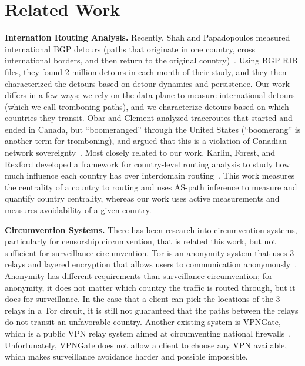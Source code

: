 \section{Related Work}
\label{related}

{\bf Internation Routing Analysis.}  Recently, Shah and Papadopoulos measured international BGP detours (paths that originate in one country, cross international borders, and then return to the original country)~\cite{shah2015characterizing}.  Using BGP RIB files, they found 2 million detours in each month of their study, and they then characterized the detours based on detour dynamics and persistence.  Our work differs in a few ways; we rely on the data-plane to measure international detours (which we call tromboning paths), and we characterize detours based on which countries they transit.  Obar and Clement analyzed traceroutes that started and ended in Canada, but ``boomeranged'' through the United States (``boomerang'' is another term for tromboning), and argued that this is a violation of Canadian network sovereignty~\cite{obar2012internet}.  Most closely related to our work, Karlin, Forest, and Rexford developed a framework for country-level routing analysis to study how much influence each country has over interdomain routing~\cite{karlin2009nation}.  This work measures the centrality of a country to routing and uses AS-path inference to measure and quantify country centrality, whereas our work uses active measurements and measures avoidability of a given country.

{\bf Circumvention Systems.}  There has been research into circumvention systems, particularly for censorship circumvention, that is related this work, but not sufficient for surveillance circumvention.  Tor is an anonymity system that uses 3 relays and layered encryption that allows users to communication anonymously~\cite{dingledine2004tor}.  Anonymity has different requirements than surveillance circumvention; for anonymity, it does not matter which country the traffic is routed through, but it does for surveillance.  In the case that a client can pick the locations of the 3 relays in a Tor circuit, it is still not guaranteed that the paths between the relays do not transit an unfavorable country.  Another existing system is VPNGate, which is a public VPN relay system aimed at circumventing national firewalls~\cite{nobori2014vpn}.  Unfortunately, VPNGate does not allow a client to choose any VPN available, which makes surveillance avoidance harder and possible impossible.

